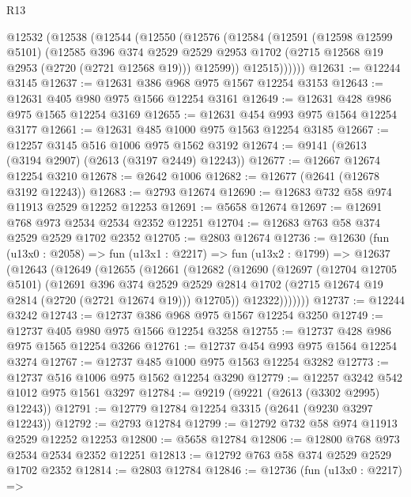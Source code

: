 \begin{lexlean}{R13}
\begin{coremodule}
    @12532
      (@12538
        (@12544
          (@12550
            (@12576
              (@12584
                (@12591
                  (@12598 @12599 @5101)
                  (@12585
                    @396
                    @374
                    @2529
                    @2529
                    @2953
                    @1702
                    (@2715 @12568 @19 @2953 (@2720 (@2721 @12568 @19)))
                    @12599))
                @12515))))))
@12631 := @12244 @3145
@12637 := @12631 @386 @968 @975 @1567 @12254 @3153
@12643 := @12631 @405 @980 @975 @1566 @12254 @3161
@12649 := @12631 @428 @986 @975 @1565 @12254 @3169
@12655 := @12631 @454 @993 @975 @1564 @12254 @3177
@12661 := @12631 @485 @1000 @975 @1563 @12254 @3185
@12667 := @12257 @3145 @516 @1006 @975 @1562 @3192
@12674 := @9141 (@2613 (@3194 @2907) (@2613 (@3197 @2449) @12243))
@12677 := @12667 @12674 @12254 @3210
@12678 := @2642 @1006
@12682 := @12677 (@2641 (@12678 @3192 @12243))
@12683 := @2793 @12674
@12690 := @12683 @732 @58 @974 @11913 @2529 @12252 @12253
@12691 := @5658 @12674
@12697 := @12691 @768 @973 @2534 @2534 @2352 @12251
@12704 := @12683 @763 @58 @374 @2529 @2529 @1702 @2352
@12705 := @2803 @12674
@12736 := @12630
    (fun (u13x0 : @2058) =>
    fun (u13x1 : @2217) =>
    fun (u13x2 : @1799) =>
    @12637
      (@12643
        (@12649
          (@12655
            (@12661
              (@12682
                (@12690
                  (@12697
                    (@12704 @12705 @5101)
                    (@12691
                      @396
                      @374
                      @2529
                      @2529
                      @2814
                      @1702
                      (@2715 @12674 @19 @2814 (@2720 (@2721 @12674 @19)))
                      @12705))
                  @12322)))))))
@12737 := @12244 @3242
@12743 := @12737 @386 @968 @975 @1567 @12254 @3250
@12749 := @12737 @405 @980 @975 @1566 @12254 @3258
@12755 := @12737 @428 @986 @975 @1565 @12254 @3266
@12761 := @12737 @454 @993 @975 @1564 @12254 @3274
@12767 := @12737 @485 @1000 @975 @1563 @12254 @3282
@12773 := @12737 @516 @1006 @975 @1562 @12254 @3290
@12779 := @12257 @3242 @542 @1012 @975 @1561 @3297
@12784 := @9219 (@9221 (@2613 (@3302 @2995) @12243))
@12791 := @12779 @12784 @12254 @3315 (@2641 (@9230 @3297 @12243))
@12792 := @2793 @12784
@12799 := @12792 @732 @58 @974 @11913 @2529 @12252 @12253
@12800 := @5658 @12784
@12806 := @12800 @768 @973 @2534 @2534 @2352 @12251
@12813 := @12792 @763 @58 @374 @2529 @2529 @1702 @2352
@12814 := @2803 @12784
@12846 := @12736
    (fun (u13x0 : @2217) =>

\end{coremodule}
\end{lexlean}
